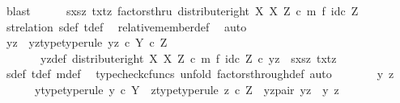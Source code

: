 \begin{isabellebody}
\ blast\isanewline
\isanewline
\ \ \ \ \isamarkupfalse%
\ {\isachardoublequoteopen}{\isasymlangle}{\isasymlangle}sx{\isacharcomma}{\kern0pt}sz{\isasymrangle}{\isacharcomma}{\kern0pt}\ {\isasymlangle}tx{\isacharcomma}{\kern0pt}tz{\isasymrangle}{\isasymrangle}\ factorsthru\ {\isacharparenleft}{\kern0pt}distribute{\isacharunderscore}{\kern0pt}right\ X\ X\ Z\ {\isasymcirc}\isactrlsub c\ m\ {\isasymtimes}\isactrlsub f\ id\isactrlsub c\ Z{\isacharparenright}{\kern0pt}{\isachardoublequoteclose}\isanewline
\ \ \ \ \ \ \isamarkupfalse%
\ st{\isacharunderscore}{\kern0pt}relation\ s{\isacharunderscore}{\kern0pt}def\ t{\isacharunderscore}{\kern0pt}def\ \isamarkupfalse%
\ relative{\isacharunderscore}{\kern0pt}member{\isacharunderscore}{\kern0pt}def{}\ \isamarkupfalse%
\ auto\isanewline
\ \ \ \ \isamarkupfalse%
\ \isamarkupfalse%
\ yz\ \ yz{\isacharunderscore}{\kern0pt}type{\isacharbrackleft}{\kern0pt}type{\isacharunderscore}{\kern0pt}rule{\isacharbrackright}{\kern0pt}{\isacharcolon}{\kern0pt}\ {\isachardoublequoteopen}yz\ {\isasymin}\isactrlsub c\ Y\ {\isasymtimes}\isactrlsub c\ Z{\isachardoublequoteclose}\isanewline
\ \ \ \ \ \ \ yz{\isacharunderscore}{\kern0pt}def{\isacharcolon}{\kern0pt}\ {\isachardoublequoteopen}{\isacharparenleft}{\kern0pt}distribute{\isacharunderscore}{\kern0pt}right\ X\ X\ Z\ {\isasymcirc}\isactrlsub c\ {\isacharparenleft}{\kern0pt}m\ {\isasymtimes}\isactrlsub f\ id\isactrlsub c\ Z{\isacharparenright}{\kern0pt}{\isacharparenright}{\kern0pt}\ {\isasymcirc}\isactrlsub c\ yz\ {\isacharequal}{\kern0pt}\ {\isasymlangle}{\isasymlangle}sx{\isacharcomma}{\kern0pt}sz{\isasymrangle}{\isacharcomma}{\kern0pt}\ {\isasymlangle}tx{\isacharcomma}{\kern0pt}tz{\isasymrangle}{\isasymrangle}{\isachardoublequoteclose}\isanewline
\ \ \ \ \ \ \isamarkupfalse%
\ s{\isacharunderscore}{\kern0pt}def\ t{\isacharunderscore}{\kern0pt}def\ m{\isacharunderscore}{\kern0pt}def\ \isamarkupfalse%
\ {\isacharparenleft}{\kern0pt}typecheck{\isacharunderscore}{\kern0pt}cfuncs{\isacharcomma}{\kern0pt}\ unfold\ factors{\isacharunderscore}{\kern0pt}through{\isacharunderscore}{\kern0pt}def{}{\isacharcomma}{\kern0pt}\ auto{\isacharparenright}{\kern0pt}\isanewline
\ \ \ \ \isamarkupfalse%
\ \isamarkupfalse%
\ y\ z\ \isanewline
\ \ \ \ \ \ y{\isacharunderscore}{\kern0pt}type{\isacharbrackleft}{\kern0pt}type{\isacharunderscore}{\kern0pt}rule{\isacharbrackright}{\kern0pt}{\isacharcolon}{\kern0pt}\ {\isachardoublequoteopen}y\ {\isasymin}\isactrlsub c\ Y{\isachardoublequoteclose}\ \ z{\isacharunderscore}{\kern0pt}type{\isacharbrackleft}{\kern0pt}type{\isacharunderscore}{\kern0pt}rule{\isacharbrackright}{\kern0pt}{\isacharcolon}{\kern0pt}\ {\isachardoublequoteopen}z\ {\isasymin}\isactrlsub c\ Z{\isachardoublequoteclose}\ \ yz{\isacharunderscore}{\kern0pt}pair{\isacharcolon}{\kern0pt}\ {\isachardoublequoteopen}yz\ {\isacharequal}{\kern0pt}\ {\isasymlangle}y{\isacharcomma}{\kern0pt}\ z{\isasymrangle}{\isachardoublequoteclose}\isanewline

\end{isabellebody}
